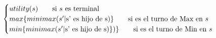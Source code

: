 \documentclass[preview]{standalone}
\begin{document}
\begin{align*}
\begin{cases}
                                 utility(s) \qquad \text{si $s$ es terminal} \cr
                                 max\{minimax(\text{$s'$}| $s'$ \text{ es hijo de }$s$)\}\qquad \text{si es el turno de Max en $s$} \cr
                                 min\{minimax(\text{$s'$}| $s'$ \text{ es hijo de }$s$)\})\}\qquad \text{si es el turno de Min en $s$} \cr
                                 \end{cases}
\end{align*}
\end{document}
